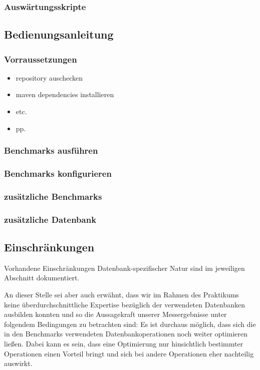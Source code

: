 \documentclass[11pt, a4paper, oneside, twocolumn]{article} %
\begin{document}
\subsubsection{Auswärtungsskripte}

\subsection{Bedienungsanleitung}
\label{subsec:bedienungsanleitung}

\subsubsection{Vorraussetzungen}

\begin{itemize}
\item repository auschecken
\item maven dependencies installieren
\item etc.
\item pp.
\end{itemize}

\subsubsection{Benchmarks ausführen}


\subsubsection{Benchmarks konfigurieren}

\subsubsection{zusätzliche Benchmarks}

\subsubsection{zusätzliche Datenbank}

\subsection{Einschränkungen}

Vorhandene Einschränkungen Datenbank-spezifischer Natur sind im jeweiligen Abschnitt dokumentiert.

An dieser Stelle sei aber auch erwähnt, dass wir im Rahmen des Praktikums keine überdurchschnittliche Expertise bezüglich der verwendeten Datenbanken ausbilden konnten und so die Aussagekraft unserer Messergebnisse unter folgendem Bedingungen zu betrachten sind: Es ist durchaus möglich, dass sich die in den Benchmarks verwendeten Datenbankoperationen noch weiter optimieren ließen. Dabei kann es sein, dass eine Optimierung nur hinsichtlich bestimmter Operationen einen Vorteil bringt und sich bei andere Operationen eher nachteilig auswirkt.
\end{document}
